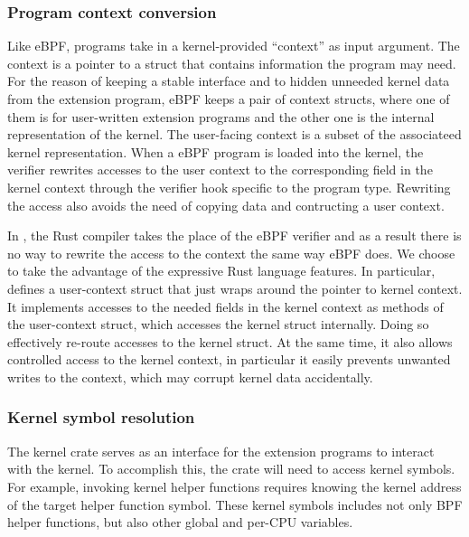 \subsubsection{Program context conversion}
\label{impl:ctx-converison}
Like eBPF, \projname{} programs take in a kernel-provided ``context'' as input
    argument.
The context is a pointer to a struct that contains information the program may
    need.
For the reason of keeping a stable interface and to hidden unneeded kernel
    data from the extension program, eBPF keeps a pair of context structs,
    where one of them is for user-written extension programs and the other one
    is the internal representation of the kernel.
The user-facing context is a subset of the associateed kernel
    representation.
When a eBPF program is loaded into the kernel, the verifier rewrites accesses
    to the user context to the corresponding field in the kernel context
    through the verifier hook specific to the program type.
Rewriting the access also avoids the need of copying data and contructing a
    user context.

In \projname{}, the Rust compiler takes the place of the eBPF verifier and as
    a result there is no way to rewrite the access to the context the same
    way eBPF does.
We choose to take the advantage of the expressive Rust language features.
In particular, \projname{} defines a user-context struct that just wraps around
    the pointer to kernel context.
It implements accesses to the needed fields in the kernel context as methods of
    the user-context struct, which accesses the kernel struct internally.
Doing so effectively re-route accesses to the kernel struct.
At the same time, it also allows controlled access to the kernel context, in
    particular it easily prevents unwanted writes to the context, which may
    corrupt kernel data accidentally.

\subsubsection{Kernel symbol resolution}
\label{impl:crate:symbol-resolv}
The \projname{} kernel crate serves as an interface for the extension programs
    to interact with the kernel.
To accomplish this, the crate will need to access kernel symbols.
For example, invoking kernel helper functions requires knowing the kernel
    address of the target helper function symbol.
These kernel symbols includes not only BPF helper functions, but also other
    global and per-CPU variables.

